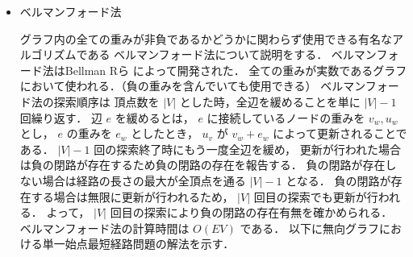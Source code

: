 \documentclass[12pt]{optlab-bachelor}
\begin{document}
\begin{itemize}
  \item ベルマンフォード法

  グラフ内の全ての重みが非負であるかどうかに関わらず使用できる有名なアルゴリズムである
  ベルマンフォード法について説明をする．
  ベルマンフォード法はBellman Rら \cite{Bellman}によって開発された．
  全ての重みが実数であるグラフにおいて使われる．（負の重みを含んでいても使用できる）
  ベルマンフォード法の探索順序は
  頂点数を $|V|$ とした時，全辺を緩めることを単に $|V|-1$ 回繰り返す．
  辺 $e$ を緩めるとは， $e$ に接続しているノードの重みを $v_w,u_w$ とし，
  $e$ の重みを $e_w$ としたとき， $u_v$ が $v_w+e_w$ によって更新されることである．
  $|V|-1$ 回の探索終了時にもう一度全辺を緩め，
  更新が行われた場合は負の閉路が存在するため負の閉路の存在を報告する．
  負の閉路が存在しない場合は経路の長さの最大が全頂点を通る $|V|-1$ となる．
  負の閉路が存在する場合は無限に更新が行われるため， $|V|$ 回目の探索でも更新が行われる．
  よって， $|V|$ 回目の探索により負の閉路の存在有無を確かめられる．
  ベルマンフォード法の計算時間は $O(EV)$ である．
  以下に無向グラフにおける単一始点最短経路問題の解法を示す．


\end{itemize}
\end{document}
